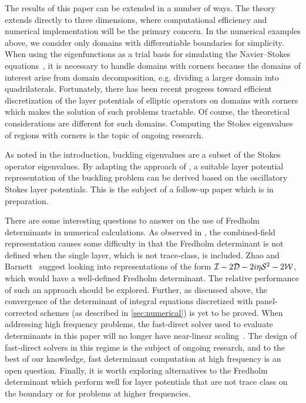 The results of this paper can be
extended in a number of ways.
%
The theory
extends directly to three dimensions, where
computational efficiency and numerical
implementation will be the primary concern.
%
In the numerical examples above, we
consider only domains with differentiable
boundaries for simplicity.
%
When using the eigenfunctions as a trial
basis for simulating the Navier--Stokes
equations~\cite{batcho1994generalized},
it is necessary to handle domains
with corners because the domains of interest
arise from domain decomposition, e.g.
dividing a larger domain into 
quadrilaterals.
Fortunately, there has been recent progress
toward efficient discretization of the
layer potentials of elliptic operators
on domains with corners
\cite{helsing2008corner,serkh2016solution,rachh2017solution,helsing2018integral}
which makes the solution of such problems
tractable.
%
Of course, the theoretical considerations
are different for such domains.
%
Computing the Stokes eigenvalues of regions
with corners is the topic of ongoing
research.

{\color{red}
  As noted in the introduction, buckling eigenvalues
are a subset of the Stokes operator
eigenvalues.}
By adapting the approach of \cite{rachh2017integral},
a suitable layer potential representation of the
buckling problem can be derived based on the
oscillatory Stokes layer potentials.
%
This is the subject of a follow-up paper which is in
preparation.

There are some interesting questions to answer
on the use of Fredholm determinants in numerical
calculations.
%
As observed in \cite{zhao2015robust}, the
combined-field representation causes some
difficulty in that the Fredholm determinant
is not defined when the single layer, which
is not trace-class, is included.
%
Zhao and Barnett~\cite{zhao2015robust}
suggest looking into
representations of the form $\mathcal I-2{\mathcal D}
-2i\eta{\mathcal S}^2-2{\mathcal W}$,
which would have a well-defined Fredholm
determinant.
%
The relative performance of
such an approach should be explored.
%
Further, as discussed above, the
convergence of the determinant of
integral equations discretized with
panel-corrected schemes (as described in
\cref{sec:numerical}) is yet to be proved.
%
When addressing high frequency problems,
the fast-direct solver used to evaluate
determinants in this paper will no longer
have near-linear scaling~\cite{ho2012fast}.
%
The design of fast-direct solvers in this
regime is the subject of ongoing research, and
to the best of our knowledge, fast determinant
computation at high frequency is an open
question.
%
Finally, it is worth exploring alternatives
to the Fredholm determinant which perform well
for layer potentials that are not trace class
on the boundary or for problems at higher
frequencies.

